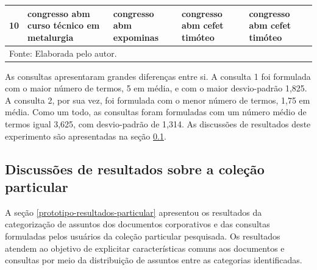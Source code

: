\begin{center}
\begin{longtable}{c|p{3cm}|p{3cm}|p{3cm}|p{3cm}}
10 & 
congresso\newline
abm\newline
\newline
\newline
curso técnico em metalurgia
 & 
congresso\newline
abm\newline
\newline
expominas
 & 
congresso\newline
abm\newline
cefet\newline
timóteo
 & 
congresso\newline
abm\newline
cefet\newline
timóteo\newline
\newline\newline
64
 \\\hline

 \hline \multicolumn{5}{l}{Fonte: Elaborada pelo autor.}

\end{longtable}
\end{center}






As consultas apresentaram grandes diferenças entre si. A consulta 1 foi formulada com o maior número de termos, 5 em média, e com o maior desvio-padrão 1,825. A consulta 2, por sua vez, foi formulada com o menor número de termos, 1,75 em média. Como um todo, as consultas foram formuladas com um número médio de termos igual 3,625, com desvio-padrão de 1,314. As discussões de resultados deste experimento são apresentadas na seção \ref{prototipo-discussoes-particular}.







\subsection{Discussões de resultados sobre a coleção particular}
\label{prototipo-discussoes-particular}

A seção \ref{prototipo-resultados-particular} apresentou os resultados da categorização de assuntos dos documentos corporativos e das consultas formuladas pelos usuários da coleção particular pesquisada. Os resultados atendem ao objetivo de explicitar características comuns aos documentos e consultas por meio da distribuição de assuntos entre as categorias identificadas.

